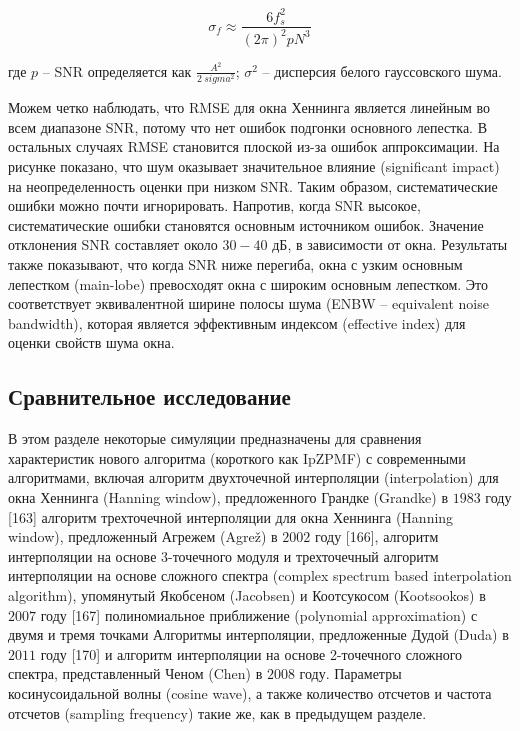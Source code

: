 \begin{equation}
\label{eq:equation61}
\sigma_{f} \approx \frac{6 f^2 _s}{{(2 \pi)^2}p N^3}
\end{equation}

где $p$ – SNR определяется как $\frac{A^2}{2 \ sigma ^2}$;
$\sigma^2$ – дисперсия белого гауссовского шума.

Можем четко наблюдать, что RMSE для окна Хеннинга является линейным во всем диапазоне SNR, потому что нет ошибок подгонки основного лепестка. В остальных случаях RMSE становится плоской из-за ошибок аппроксимации. На рисунке показано, что шум оказывает значительное влияние (significant impact) на неопределенность оценки при низком SNR. Таким образом, систематические ошибки можно почти игнорировать. Напротив, когда SNR высокое, систематические ошибки становятся основным источником ошибок. Значение отклонения SNR составляет около $30-40$ дБ, в зависимости от окна. Результаты также показывают, что когда SNR ниже перегиба, окна с узким основным лепестком (main-lobe) превосходят окна с широким основным лепестком. Это соответствует эквивалентной ширине полосы шума (ENBW – equivalent noise bandwidth), которая является эффективным индексом (effective index) для оценки свойств шума окна. 

\subsection{Сравнительное исследование} \label{sec:ch2/sec5_5}

В этом разделе некоторые симуляции предназначены для сравнения характеристик нового алгоритма (короткого как IpZPMF) с современными алгоритмами, включая алгоритм двухточечной интерполяции (interpolation) для окна Хеннинга (Hanning window), предложенного Грандке (Grandke) в $1983$ году [163] алгоритм трехточечной интерполяции для окна Хеннинга (Hanning window), предложенный Агрежем (Agrež) в $2002$ году [166], алгоритм интерполяции на основе 3-точечного модуля и трехточечный алгоритм интерполяции на основе сложного спектра (complex spectrum based interpolation algorithm), упомянутый Якобсеном (Jacobsen) и Коотсукосом (Kootsookos) в $2007$ году [167] полиномиальное приближение (polynomial approximation) с двумя и тремя точками Алгоритмы интерполяции, предложенные Дудой (Duda) в $2011$ году [170] и алгоритм интерполяции на основе 2-точечного сложного спектра, представленный Ченом (Chen) в $2008$ году. Параметры косинусоидальной волны (cosine wave), а также количество отсчетов и частота отсчетов (sampling frequency) такие же, как в предыдущем разделе.

